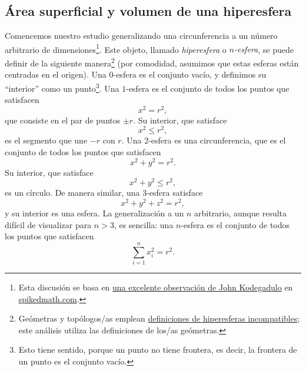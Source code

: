   \subsection{Área superficial y volumen de una hiperesfera} %
  \label{sec:volume_of_a_hypersphere}

Comencemos nuestro estudio generalizando una circunferencia a un número arbitrario de dimensiones\footnote{Esta discusión se basa en \href{http://spikedmath.com/forum/viewtopic.php?f=30&t=147\#p1577}{una excelente observación de John Kodegadulo} en \href{http://spikedmath.com/}{spikedmath.com}.}. Este objeto, llamado \emph{hiperesfera} o \emph{$n$-esfera}, se puede definir de la siguiente manera\footnote{Geómetras y topólogos/as emplean \href{http://mathworld.wolfram.com/Hypersphere.html}{definiciones de hiperesferas incompatibles}; este análisis utiliza las definiciones de los/as geómetras.} (por comodidad, asumimos que estas esferas están centradas en el origen). Una $0$-esfera es el conjunto vacío, y definimos su ``interior'' como un punto\footnote{Esto tiene sentido, porque un punto no tiene frontera, es decir, la frontera de un punto es el conjunto vacío.}. Una $1$-esfera es el conjunto de todos los puntos que satisfacen
\[
x^2 = r^2,
\]
que consiste en el par de puntos $\pm r$. Su interior, que satisface
\[
x^2 \leq r^2,
\]
es el segmento que une $-r$ con $r$. Una $2$-esfera es una circunferencia, que es el conjunto de todos los puntos que satisfacen
\[
x^2 + y^2 = r^2.
\]
Su interior, que satisface
\[
x^2 + y^2 \leq r^2,
\]
es un círculo. De manera similar, una $3$-esfera satisface
\[
x^2 + y^2 + z^2 = r^2,
\]
y su interior es una esfera. La generalización a un $n$ arbitrario, aunque resulta difícil de visualizar para $n > 3$, es sencilla: una $n$-esfera es el conjunto de todos los puntos que satisfacen
\[
\sum_{i=1}^{n} x_i^2 = r^2.
\]

